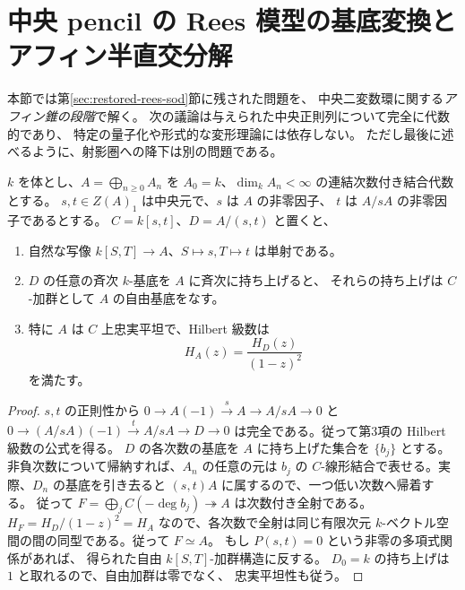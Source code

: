 \section{中央 pencil の Rees 模型の基底変換とアフィン半直交分解}
\label{sec:central-basechange}
本節では第\ref{sec:restored-rees-sod}節に残された問題を、
中央二変数環に関する\emph{アフィン錐の段階}で解く。
次の議論は与えられた中央正則列について完全に代数的であり、
特定の量子化や形式的な変形理論には依存しない。
ただし最後に述べるように、射影圏への降下は別の問題である。

\begin{theorem}[中央正則列に関する次数付き自由性]
\label{thm:central-graded-freeness}
$k$ を体とし、$A=\bigoplus_{n\ge0}A_n$ を
$A_0=k$、$\dim_kA_n<\infty$ の連結次数付き結合代数とする。
$s,t\in Z(A)_1$ は中央元で、$s$ は $A$ の非零因子、
$t$ は $A/sA$ の非零因子であるとする。
$C=k[s,t]$、$D=A/(s,t)$ と置くと、
\begin{enumerate}
\item 自然な写像 $k[S,T]\to A$、$S\mapsto s,T\mapsto t$ は単射である。
\item $D$ の任意の斉次 $k$-基底を $A$ に斉次に持ち上げると、
それらの持ち上げは $C$-加群として $A$ の自由基底をなす。
\item 特に $A$ は $C$ 上忠実平坦で、Hilbert 級数は
\[
 H_A(z)=\frac{H_D(z)}{(1-z)^2}
\]
を満たす。
\end{enumerate}
\end{theorem}
\begin{proof}
$s,t$ の正則性から
$0\to A(-1)\xrightarrow{s}A\to A/sA\to0$ と
$0\to (A/sA)(-1)\xrightarrow{t}A/sA\to D\to0$
は完全である。従って第3項の Hilbert 級数の公式を得る。
$D$ の各次数の基底を $A$ に持ち上げた集合を $\{b_j\}$ とする。
非負次数について帰納すれば、$A_n$ の任意の元は $b_j$ の
$C$-線形結合で表せる。実際、$D_n$ の基底を引き去ると
$(s,t)A$ に属するので、一つ低い次数へ帰着する。
従って
$F=\bigoplus_jC(-\deg b_j)\twoheadrightarrow A$
は次数付き全射である。
$H_F=H_D/(1-z)^2=H_A$ なので、各次数で全射は同じ有限次元
$k$-ベクトル空間の間の同型である。従って $F\simeq A$。
もし $P(s,t)=0$ という非零の多項式関係があれば、
得られた自由 $k[S,T]$-加群構造に反する。
$D_0=k$ の持ち上げは $1$ と取れるので、自由加群は零でなく、
忠実平坦性も従う。
\end{proof}

